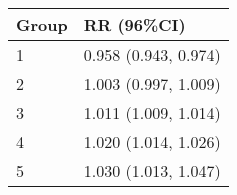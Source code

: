 \begin{tabular}{ll}
  \hline
Group & RR (96\%CI) \\ 
  \hline
   1 & 0.958 (0.943, 0.974) \\ 
     2 & 1.003 (0.997, 1.009) \\ 
     3 & 1.011 (1.009, 1.014) \\ 
     4 & 1.020 (1.014, 1.026) \\ 
     5 & 1.030 (1.013, 1.047) \\ 
   \hline
\end{tabular}


